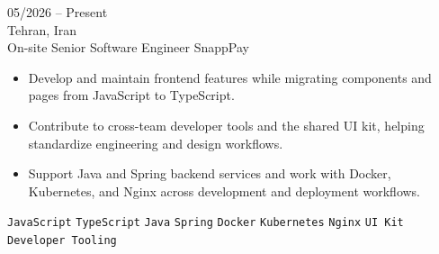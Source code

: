 \entry
{05/2026 -- Present \\ Tehran, Iran \\ On-site}
{Senior Software Engineer}
{SnappPay}
{\vspace{-10pt}
    \begin{itemize}[noitemsep,topsep=0pt,parsep=0pt,partopsep=0pt, leftmargin=-1pt]
        \item Develop and maintain frontend features while migrating components and pages from JavaScript to TypeScript.
        \item Contribute to cross-team developer tools and the shared UI kit, helping standardize engineering and design workflows.
        \item Support Java and Spring backend services and work with Docker, Kubernetes, and Nginx across development and deployment workflows.
    \end{itemize}
    \texttt{JavaScript} \slashsep \texttt{TypeScript} \slashsep \texttt{Java} \slashsep \texttt{Spring} \slashsep \texttt{Docker} \slashsep \texttt{Kubernetes} \slashsep \texttt{Nginx} \slashsep \texttt{UI Kit} \slashsep \texttt{Developer Tooling}
}
